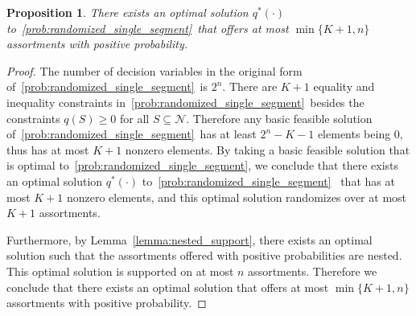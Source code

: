 \documentclass[msom,non-blindrev]{informs3} %
\newtheorem{proposition}[theorem]{Proposition}
\theoremstyle{definition}
\begin{document}


\begin{proposition}\label{prop:num_assortment}
There exists an optimal solution $q^*(\cdot)$ to~\eqref{prob:randomized_single_segment}~that offers at most $\min\{K+1,n\}$ assortments with positive probability.
\end{proposition}

\begin{proof}
The number of decision variables in the original form of~\eqref{prob:randomized_single_segment}~is 
$2^n$. There are $K+1$ equality and inequality constraints in~\eqref{prob:randomized_single_segment}~besides the constraints $q(S)\geq 0$ for all $S\subseteq\mathcal{N}$. Therefore any basic feasible solution of~\eqref{prob:randomized_single_segment}~has at least $2^n-K-1$ elements being $0$, thus has at most $K+1$ nonzero elements. By taking a basic feasible solution that is optimal to~\eqref{prob:randomized_single_segment}, we conclude that there exists an optimal solution $q^*(\cdot)$ to~\eqref{prob:randomized_single_segment}~ that has at most $K+1$ nonzero elements, and this optimal solution randomizes over at most $K+1$ assortments. 

Furthermore, by Lemma~\ref{lemma:nested_support}, there exists an optimal solution such that the assortments offered with positive probabilities are nested. This optimal solution is supported on at most $n$ assortments. Therefore we conclude that there exists an optimal solution that offers at most $\min\{K+1,n\}$ assortments with positive probability.
\end{proof}
\end{document}
